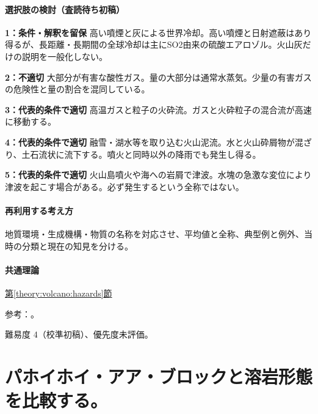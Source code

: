 \paragraph{選択肢の検討（査読待ち初稿）}\mbox{}\par

\noindent\textbf{1：条件・解釈を留保} 高い噴煙と灰による世界冷却。高い噴煙と日射遮蔽はあり得るが、長距離・長期間の全球冷却は主にSO2由来の硫酸エアロゾル。火山灰だけの説明を一般化しない。\par

\noindent\textbf{2：不適切} 大部分が有害な酸性ガス。量の大部分は通常水蒸気。少量の有害ガスの危険性と量の割合を混同している。\par

\noindent\textbf{3：代表的条件で適切} 高温ガスと粒子の火砕流。ガスと火砕粒子の混合流が高速に移動する。\par

\noindent\textbf{4：代表的条件で適切} 融雪・湖水等を取り込む火山泥流。水と火山砕屑物が混ざり、土石流状に流下する。噴火と同時以外の降雨でも発生し得る。\par

\noindent\textbf{5：代表的条件で適切} 火山島噴火や海への岩屑で津波。水塊の急激な変位により津波を起こす場合がある。必ず発生するという全称ではない。\par

\paragraph{再利用する考え方} 地質環境・生成機構・物質の名称を対応させ、平均値と全称、典型例と例外、当時の分類と現在の知見を分ける。

\paragraph{共通理論} \hyperref[theory:volcano:hazards]{第\ref*{theory:volcano:hazards}節}

\par 参考：\cite{vol50_gas_ref,vol50_climate_ref,volc_usgs_msh_flow}。

\par 難易度 4（校準初稿）、優先度未評価。

\section{パホイホイ・アア・ブロックと溶岩形態を比較する。}

